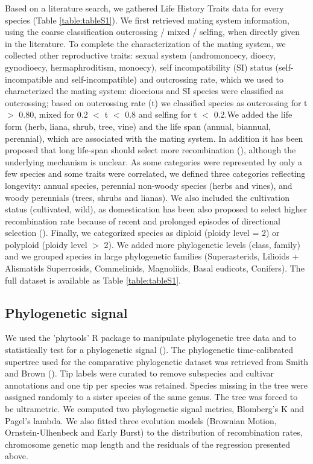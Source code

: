 \documentclass{article}
\begin{document}
 Based on a literature search, we gathered Life History Traits data for every species (Table \ref{table:tableS1}). We first retrieved mating system information, using the coarse classification outcrossing / mixed / selfing, when directly given in the literature. To complete the characterization of the mating system, we collected other reproductive traits: sexual system (andromonoecy, dioecy, gynodioecy, hermaphroditism, monoecy), self incompatibility (SI) status (self-incompatible and self-incompatible) and outcrossing rate, which we used to characterized the mating system: dioecious and SI species were classified as outcrossing; based on outcrossing rate (t) we classified species as outcrossing for t $>$ 0.80, mixed for 0.2 $<$ t $<$ 0.8 and selfing for t $<$ 0.2.We added the life form (herb, liana, shrub, tree, vine) and the life span (annual, biannual, perennial), which are associated with the mating system. In addition it has been proposed that long life-span should select more recombination (\cite{burtMammalianChiasmaFrequencies1987}), although the underlying mechanism is unclear. As some categories were represented by only a few species and some traits were correlated, we defined three categories reflecting longevity: annual species, perennial non-woody species (herbs and vines), and woody perennials (trees, shrubs and lianas). We also included the cultivation status (cultivated, wild), as domestication has been also proposed to select higher recombination rate because of recent and prolonged episodes of directional selection (\cite{ross-ibarraGenomeSizeRecombination2007a,burtMammalianChiasmaFrequencies1987}). Finally, we categorized species as diploid (ploidy level = 2) or polyploid (ploidy level $>$ 2). We added more phylogenetic levels (class, family) and we grouped species in large phylogenetic families (Superasterids, Lilioids + Alismatids Superrosids, Commelinids, Magnoliids, Basal eudicots, Conifers). The full dataset is available as Table \ref{table:tableS1}.

 
\subsection*{Phylogenetic signal}


We used the 'phytools' R package to manipulate phylogenetic tree data and to statistically test for a phylogenetic signal (\cite{revellPhytoolsUpdatedEcosystem2024}). The phylogenetic time-calibrated supertree used for the comparative phylogenetic dataset was retrieved from Smith and Brown (\cite{smithConstructingBroadlyInclusive2018}). Tip labels were curated to remove subspecies and cultivar annotations and one tip per species was retained. Species missing in the tree were assigned randomly to a sister species of the same genus. The tree was forced to be ultrametric. We computed two phylogenetic signal metrics, Blomberg's K and Pagel's lambda. We also fitted three evolution models (Brownian Motion, Ornstein-Ulhenbeck and Early Burst) to the distribution of recombination rates, chromosome genetic map length and the residuals of the regression presented above.
\end{document}
